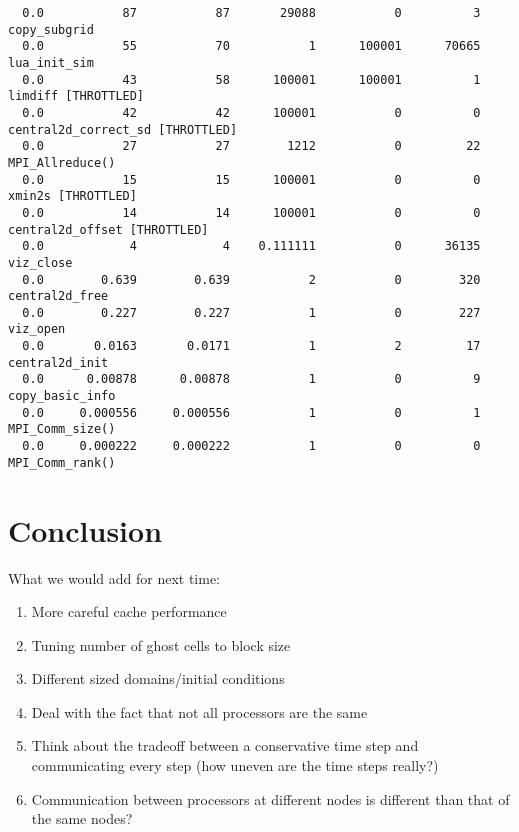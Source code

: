 \documentclass{article}
\begin{document}
{\begin{verbatim}
  0.0           87           87       29088           0          3 copy_subgrid 
  0.0           55           70           1      100001      70665 lua_init_sim 
  0.0           43           58      100001      100001          1 limdiff [THROTTLED]
  0.0           42           42      100001           0          0 central2d_correct_sd [THROTTLED]
  0.0           27           27        1212           0         22 MPI_Allreduce() 
  0.0           15           15      100001           0          0 xmin2s [THROTTLED]
  0.0           14           14      100001           0          0 central2d_offset [THROTTLED]
  0.0            4            4    0.111111           0      36135 viz_close 
  0.0        0.639        0.639           2           0        320 central2d_free 
  0.0        0.227        0.227           1           0        227 viz_open 
  0.0       0.0163       0.0171           1           2         17 central2d_init 
  0.0      0.00878      0.00878           1           0          9 copy_basic_info 
  0.0     0.000556     0.000556           1           0          1 MPI_Comm_size() 
  0.0     0.000222     0.000222           1           0          0 MPI_Comm_rank() 
\end{verbatim}
}



\section{Conclusion}
What we would add for next time:
\begin{enumerate}
	\item More careful cache performance
	\item Tuning number of ghost cells to block size
	\item Different sized domains/initial conditions
	\item Deal with the fact that not all processors are the same
	\item Think about the tradeoff between a conservative time step and communicating every step (how uneven are the time steps really?)
	\item Communication between processors at different nodes is different than that of the same nodes?
\end{enumerate}
\end{document}
